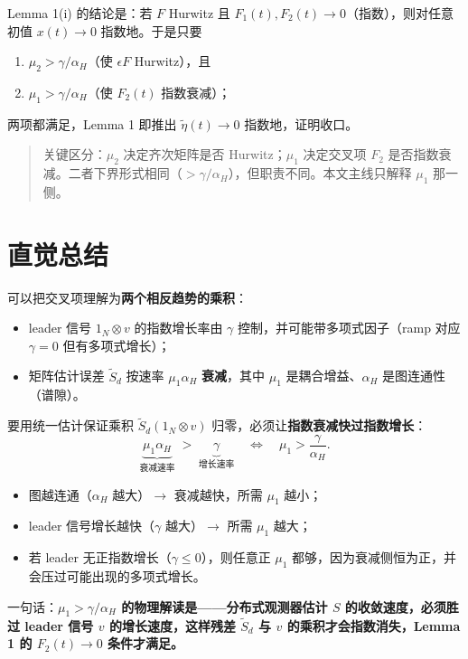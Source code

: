 \documentclass[UTF8]{ctexart}
\begin{document}
Lemma 1(i) 的结论是：若 $F$ Hurwitz 且 $F_1(t), F_2(t) \to 0$（指数），则对任意初值 $x(t) \to 0$ 指数地。于是只要
\begin{enumerate}
  \item $\mu_2 > \gamma/\alpha_H$（使 $\epsilon F$ Hurwitz），且
  \item $\mu_1 > \gamma/\alpha_H$（使 $F_2(t)$ 指数衰减）；
\end{enumerate}
两项都满足，Lemma 1 即推出 $\tilde{\eta}(t) \to 0$ 指数地，证明收口。

\begin{quote}
关键区分：$\mu_2$ 决定齐次矩阵是否 Hurwitz；$\mu_1$ 决定交叉项 $F_2$ 是否指数衰减。二者下界形式相同（$> \gamma/\alpha_H$），但职责不同。本文主线只解释 $\mu_1$ 那一侧。
\end{quote}

\section{直觉总结}

可以把交叉项理解为\textbf{两个相反趋势的乘积}：
\begin{itemize}
  \item leader 信号 $1_N \otimes v$ 的指数增长率由 $\gamma$ 控制，并可能带多项式因子（ramp 对应 $\gamma=0$ 但有多项式增长）；
  \item 矩阵估计误差 $\tilde{S}_d$ 按速率 $\mu_1 \alpha_H$ \textbf{衰减}，其中 $\mu_1$ 是耦合增益、$\alpha_H$ 是图连通性（谱隙）。
\end{itemize}

要用统一估计保证乘积 $\tilde{S}_d(1_N \otimes v)$ 归零，必须让\textbf{指数衰减快过指数增长}：
\[
\underbrace{\mu_1 \alpha_H}_{\text{衰减速率}} \;>\; \underbrace{\gamma}_{\text{增长速率}}
\quad\Longleftrightarrow\quad
\mu_1 > \frac{\gamma}{\alpha_H}.
\]

\begin{itemize}
  \item 图越连通（$\alpha_H$ 越大）$\to$ 衰减越快，所需 $\mu_1$ 越小；
  \item leader 信号增长越快（$\gamma$ 越大）$\to$ 所需 $\mu_1$ 越大；
  \item 若 leader 无正指数增长（$\gamma \leq 0$），则任意正 $\mu_1$ 都够，因为衰减侧恒为正，并会压过可能出现的多项式增长。
\end{itemize}

一句话：\textbf{$\mu_1 > \gamma/\alpha_H$ 的物理解读是——分布式观测器估计 $S$ 的收敛速度，必须胜过 leader 信号 $v$ 的增长速度，这样残差 $\tilde{S}_d$ 与 $v$ 的乘积才会指数消失，Lemma 1 的 $F_2(t) \to 0$ 条件才满足。}
\end{document}
